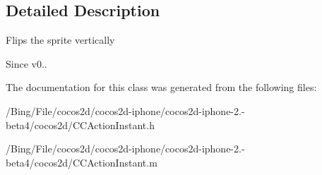 \subsection{Detailed Description}
Flips the sprite vertically \begin{DoxySince}{Since}
v0.. 
\end{DoxySince}


The documentation for this class was generated from the following files\-:\begin{DoxyCompactItemize}
\item 
/\-Bing/\-File/cocos2d/cocos2d-\/iphone/cocos2d-\/iphone-\/2.-\/beta4/cocos2d/C\-C\-Action\-Instant.\-h\item 
/\-Bing/\-File/cocos2d/cocos2d-\/iphone/cocos2d-\/iphone-\/2.-\/beta4/cocos2d/C\-C\-Action\-Instant.\-m\end{DoxyCompactItemize}
